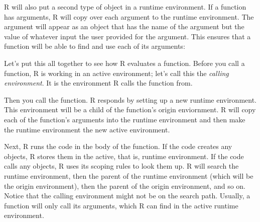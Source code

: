 \documentclass[
  letterpaper,
  DIV=11,
  numbers=noendperiod]{scrbook}
\newenvironment{Shaded}{\begin{snugshade}}{\end{snugshade}}
\newcommand{\AttributeTok}[1]{\textcolor[rgb]{0.40,0.45,0.13}{#1}}
\newcommand{\ControlFlowTok}[1]{\textcolor[rgb]{0.00,0.23,0.31}{\textbf{#1}}}
\newcommand{\DocumentationTok}[1]{\textcolor[rgb]{0.37,0.37,0.37}{\textit{#1}}}
\newcommand{\FunctionTok}[1]{\textcolor[rgb]{0.28,0.35,0.67}{#1}}
\newcommand{\NormalTok}[1]{\textcolor[rgb]{0.00,0.23,0.31}{#1}}
\newcommand{\OtherTok}[1]{\textcolor[rgb]{0.00,0.23,0.31}{#1}}
\newcommand{\StringTok}[1]{\textcolor[rgb]{0.13,0.47,0.30}{#1}}
\begin{document}
R will also put a second type of object in a runtime environment. If a
function has arguments, R will copy over each argument to the runtime
environment. The argument will appear as an object that has the name of
the argument but the value of whatever input the user provided for the
argument. This ensures that a function will be able to find and use each
of its arguments:

\begin{Shaded}
\end{Shaded}

Let's put this all together to see how R evaluates a function. Before
you call a function, R is working in an active environment; let's call
this the \emph{calling environment}. It is the environment R calls the
function from.

Then you call the function. R responds by setting up a new runtime
environment. This environment will be a child of the function's origin
enviornment. R will copy each of the function's arguments into the
runtime environment and then make the runtime environment the new active
environment.

Next, R runs the code in the body of the function. If the code creates
any objects, R stores them in the active, that is, runtime environment.
If the code calls any objects, R uses its scoping rules to look them up.
R will search the runtime environment, then the parent of the runtime
environment (which will be the origin environment), then the parent of
the origin environment, and so on. Notice that the calling environment
might not be on the search path. Usually, a function will only call its
arguments, which R can find in the active runtime environment.
\end{document}
